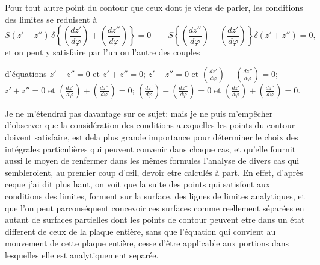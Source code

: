 \documentclass[11pt,a4paper]{article}
\begin{document}
Pour tout autre point du contour que ceux dont je viens
de parler, les conditions des limites se reduisent à
\[ S(z'-z'')\,\delta\left\{\left(\frac{dz'}{d\varphi}\right) + \left(\frac{dz''}{d\varphi}\right)\right\} = 0 \qquad S\left\{\left(\frac{dz''}{d\varphi}\right) - \left(\frac{dz'}{d\varphi}\right)\right\}\delta(z'+z'') = 0, \]
et on peut y satisfaire par l'un ou l'autre des couples


d'équations $z'-z''=0$ et $z'+z''=0$; $z'-z''=0$ et $\left(\frac{dz'}{d\varphi}\right) - \left(\frac{dz''}{d\varphi}\right) = 0$;
$z'+z''=0$ et $\left(\frac{dz'}{d\varphi}\right) + \left(\frac{dz''}{d\varphi}\right) = 0$; $\left(\frac{dz'}{d\varphi}\right) - \left(\frac{dz''}{d\varphi}\right) = 0$ et $\left(\frac{dz'}{d\varphi}\right) + \left(\frac{dz''}{d\varphi}\right) = 0$.

Je ne m'étendrai pas davantage sur ce sujet: mais je
ne puis m'empêcher d'observer que la considération
des conditions auxquelles les points du contour doivent
satisfaire, est dela plus grande importance pour déterminer
le choix des intégrales particulières qui peuvent convenir
dans chaque cas, et qu'elle fournit aussi le moyen
de renfermer dans les mêmes formules l'analyse de
divers cas qui sembleroient, au premier coup d'œil, devoir
etre calculés à part. En effet, d'après ceque j'ai dit
plus haut, on voit que la suite des points qui satisfont
aux conditions des  limites, forment sur la surface, des
lignes de limites analytiques, et que l'on peut
parconséquent concevoir ces surfaces comme reellement séparées
en autant de surfaces partielles dont les points de
contour peuvent etre dans un état different de ceux
de la plaque entière, sans que  l'équation qui
convient au mouvement de cette plaque entière,
cesse d'être applicable aux portions dans lesquelles
elle est analytiquement separée.
\end{document}
